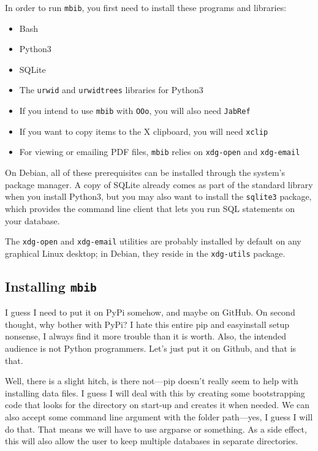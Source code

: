 \documentclass[10pt]{article}
\newcommand{\mbib}{\texttt{mbib}\xspace}
\newcommand{\jabref}{\texttt{JabRef}\xspace}
\newcommand*{\ooo}{\texttt{OOo}\xspace}
\begin{document}
In order to run \mbib, you first need to install these programs and libraries:

\begin{itemize}
\item Bash
\item Python3 
\item SQLite
\item The \texttt{urwid} and \texttt{urwidtrees} libraries for Python3
\item If you intend to use \mbib with \ooo, you will also need \jabref
\item If you want to copy items to the X clipboard, you will need \texttt{xclip}
\item For viewing or emailing PDF files, \mbib relies on \texttt{xdg-open} and \texttt{xdg-email}
\end{itemize}

\noindent On Debian, all of these prerequisites can be installed through the system's package manager. A copy of SQLite already comes as part of the standard library when you install Python3, but you may also want to install the \texttt{sqlite3} package, which provides the command line client that lets you run SQL statements on your database. 

The \texttt{xdg-open} and \texttt{xdg-email} utilities are probably installed by default on any graphical Linux desktop; in Debian, they reside in the \texttt{xdg-utils} package.

\subsection{Installing \mbib}



I guess I need to put it on PyPi somehow, and maybe on GitHub. On second thought, why bother with PyPi? I hate this entire pip and easyinstall setup nonsense, I always find it more trouble than it is worth. Also, the intended audience is not Python programmers. Let's just put it on Github, and that is that. 

Well, there is a slight hitch, is there not---pip doesn't really seem to help with installing data files. I guess I will deal with this by creating some bootstrapping code that looks for the directory on start-up and creates it when needed. We can also accept some command line argument with the folder path---yes, I guess I will do that. That means we will have to use argparse or something. As a side effect, this will also allow the user to keep multiple databases in separate directories. 
\end{document}
